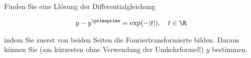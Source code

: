 
\begin{exercise}

Finden Sie eine Llösung der Differentialgleichung

\begin{align}
    \label{eq:3}
    y - y^\primeprime = \exp(-|t|),
    \quad
    t \in \R
\end{align}

indem Sie zuerst von beiden Seiten die Fouriertransformierte bilden.
Daraus können Sie (am kürzesten ohne Verwendung der Umkehrformel!) $y$ bestimmen.

\end{exercise}


